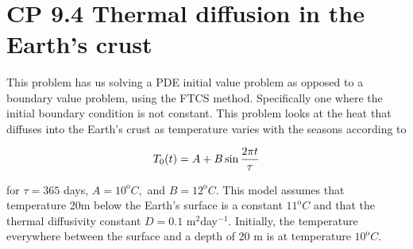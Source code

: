 \documentclass[11pt]{article}
\begin{document}
    \begin{center}
    \end{center}
    { \hspace*{\fill} \\}
    
    \section{CP 9.4 Thermal diffusion in the Earth's
crust}\label{cp-9.4-thermal-diffusion-in-the-earths-crust}

This problem has us solving a PDE initial value problem as opposed to a
boundary value problem, using the FTCS method. Specifically one where
the initial boundary condition is not constant. This problem looks at
the heat that diffuses into the Earth's crust as temperature varies with
the seasons according to

\[T_0(t) = A + B\sin {2\pi t\over\tau}\]

for \(\tau = 365\) days, \(A = 10^\text{o}C,\) and \(B = 12^\text{o}C.\)
This model assumes that temperature 20m below the Earth's surface is a
constant \(11^\text{o}C\) and that the thermal diffusivity constant
\(D = 0.1\) m\(^2\)day\(^{-1}\). Initially, the temperature everywhere
between the surface and a depth of 20 m is at temperature
\(10^\text{o}C.\)
\end{document}
